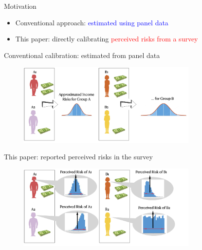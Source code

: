 \documentclass{beamer}
\begin{document}
\begin{frame}{Motivation}
\begin{itemize}
	\begin{itemize}
		\item Conventional approach: \textcolor{blue}{estimated using panel data}
		\item This paper: directly calibrating \textcolor{red}{perceived risks from a survey}
	\end{itemize}
	\end{itemize}
\end{frame}



\begin{frame}{Conventional calibration: estimated from panel data}
	\begin{figure}
		\centering
		\label{fig: conventional_approach}
		\includegraphics[width=0.8\textwidth]{figures/conventional_approach.png}
	\end{figure}
	
\end{frame}


\begin{frame}{This paper: reported perceived risks in the survey}
	\begin{figure}
		\centering
		\label{fig: my_approach}
		\includegraphics[width=0.8\textwidth]{figures/my_approach.png}
	\end{figure}
	
\end{frame}
\end{document}

